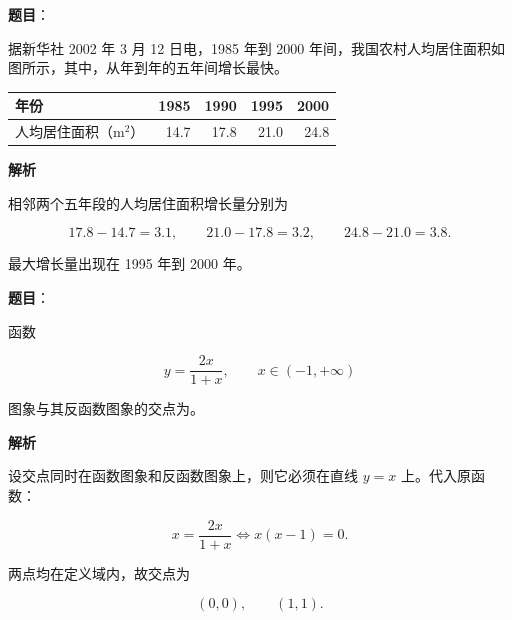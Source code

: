 \begin{answer}

\textbf{题目}：

据新华社 2002 年 3 月 12 日电，1985 年到 2000 年间，我国农村人均居住面积如图所示，其中，从\gkblank{}年到\gkblank{}年的五年间增长最快。
\nopagebreak[4]
\begin{center}\end{center}
\nopagebreak[4]
\begin{center}
\begin{tabular}{lrrrr}
\toprule
年份 & 1985 & 1990 & 1995 & 2000 \\
\midrule
人均居住面积（$\mathrm{m^2}$） & 14.7 & 17.8 & 21.0 & 24.8 \\
\bottomrule
\end{tabular}
\end{center}

\textbf{解析}

相邻两个五年段的人均居住面积增长量分别为

\nopagebreak[4]
\[
17.8-14.7=3.1,\qquad
21.0-17.8=3.2,\qquad
24.8-21.0=3.8.
\]

最大增长量出现在 1995 年到 2000 年。


\end{answer}
\begin{answer}

\textbf{题目}：

函数

\nopagebreak[4]
\[
y=\frac{2x}{1+x},\qquad x\in(-1,+\infty)
\]

图象与其反函数图象的交点为\gkblank{}。

\textbf{解析}

设交点同时在函数图象和反函数图象上，则它必须在直线 $y=x$ 上。代入原函数：

\nopagebreak[4]
\[
x=\frac{2x}{1+x}
\Longleftrightarrow x(x-1)=0.
\]

两点均在定义域内，故交点为

\nopagebreak[4]
\[
(0,0),\qquad(1,1).
\]


\end{answer}
